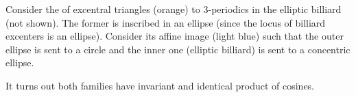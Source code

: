 Consider the of excentral triangles (orange) to 3-periodics in the elliptic billiard (not shown). The former is inscribed in an ellipse (since the locus of billiard excenters is an ellipse). Consider its affine image (light blue) such that the outer ellipse is sent to a circle and the inner one (elliptic billiard) is sent to a concentric ellipse. 

It turns out both families have invariant and identical product of cosines.